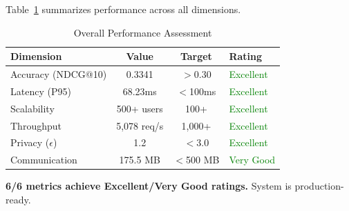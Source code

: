 Table~\ref{tab:assessment} summarizes performance across all dimensions.

\begin{table}[h]
\centering
\small
\caption{Overall Performance Assessment}
\label{tab:assessment}
\begin{tabular}{lccl}
\toprule
\textbf{Dimension} & \textbf{Value} & \textbf{Target} & \textbf{Rating} \\
\midrule
Accuracy (NDCG@10) & 0.3341 & $>$0.30 & \textcolor{green}{Excellent} \\
Latency (P95) & 68.23ms & $<$100ms & \textcolor{green}{Excellent} \\
Scalability & 500+ users & 100+ & \textcolor{green}{Excellent} \\
Throughput & 5,078 req/s & 1,000+ & \textcolor{green}{Excellent} \\
Privacy ($\epsilon$) & 1.2 & $<$3.0 & \textcolor{green}{Excellent} \\
Communication & 175.5 MB & $<$500 MB & \textcolor{green}{Very Good} \\
\bottomrule
\end{tabular}
\end{table}

\textbf{6/6 metrics achieve Excellent/Very Good ratings.} System is production-ready.

